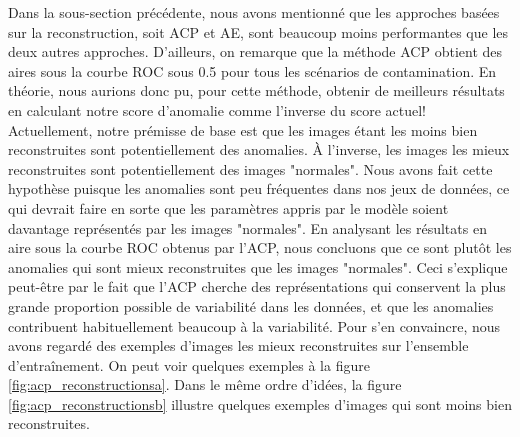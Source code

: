 Dans la sous-section précédente, nous avons mentionné que les approches basées sur la reconstruction, soit ACP et AE, sont beaucoup moins performantes que les deux autres approches. D'ailleurs, on remarque que la méthode ACP obtient des aires sous la courbe ROC sous 0.5 pour tous les scénarios de contamination. En théorie, nous aurions donc pu, pour cette méthode, obtenir de meilleurs résultats en calculant notre score d'anomalie comme l'inverse du score actuel! Actuellement, notre prémisse de base est que les images étant les moins bien reconstruites sont potentiellement des anomalies. À l'inverse, les images les mieux reconstruites sont potentiellement des images "normales". Nous avons fait cette hypothèse puisque les anomalies sont peu fréquentes dans nos jeux de données, ce qui devrait faire en sorte que les paramètres appris par le modèle soient davantage représentés par les images "normales". En analysant les résultats en aire sous la courbe ROC obtenus par l'ACP, nous concluons que ce sont plutôt les anomalies qui sont mieux reconstruites que les images "normales". Ceci s'explique peut-être par le fait que l'ACP cherche des représentations qui conservent la plus grande proportion possible de variabilité dans les données, et que les anomalies contribuent habituellement beaucoup à la variabilité. Pour s'en convaincre, nous avons regardé des exemples d'images les mieux reconstruites sur l'ensemble d'entraînement. On peut voir quelques exemples à la figure \ref{fig:acp_reconstructionsa}. Dans le même ordre d'idées, la figure \ref{fig:acp_reconstructionsb} illustre quelques exemples d'images qui sont moins bien reconstruites. 

